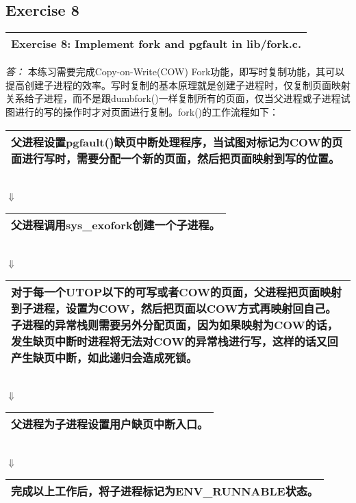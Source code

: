 \documentclass[11pt,a4paper]{article}
\newcommand{\exercise}[2]{
\begin{tabular}{|p{\textwidth}|}
\hline
#1: #2\\
\hline
\end{tabular}
\textit{\large{答：}}}
\begin{document}
\subsection{Exercise 8}
\exercise{Exercise 8}{Implement fork and pgfault in lib/fork.c. }
本练习需要完成Copy-on-Write(COW) Fork功能，即写时复制功能，其可以提高创建子进程的效率。写时复制的基本原理就是创建子进程时，仅复制页面映射关系给子进程，而不是跟dumbfork()一样复制所有的页面，仅当父进程或子进程试图进行的写的操作时才对页面进行复制。fork()的工作流程如下：\\
\begin{tabular}{|p{}|}
\hline
父进程设置pgfault()缺页中断处理程序，当试图对标记为COW的页面进行写时，需要分配一个新的页面，然后把页面映射到写的位置。\\
\hline
\end{tabular}
\\$\Downarrow$\\
\begin{tabular}{|p{}|}
\hline
父进程调用sys\_exofork创建一个子进程。\\
\hline
\end{tabular}
\\$\Downarrow$\\
\begin{tabular}{|p{}|}
\hline
对于每一个UTOP以下的可写或者COW的页面，父进程把页面映射到子进程，设置为COW，然后把页面以COW方式再映射回自己。子进程的异常栈则需要另外分配页面，因为如果映射为COW的话，发生缺页中断时进程将无法对COW的异常栈进行写，这样的话又回产生缺页中断，如此递归会造成死锁。\\
\hline
\end{tabular}
\\$\Downarrow$\\
\begin{tabular}{|p{}|}
\hline
父进程为子进程设置用户缺页中断入口。\\
\hline
\end{tabular}
\\$\Downarrow$\\
\begin{tabular}{|p{}|}
\hline
完成以上工作后，将子进程标记为ENV\_RUNNABLE状态。\\
\hline
\end{tabular}
\\
\end{document}
